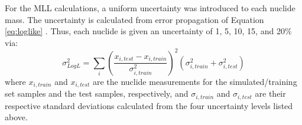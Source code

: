 For the \gls{MLL} calculations, a uniform uncertainty was introduced to each
nuclide mass.  The uncertainty is calculated from error propagation of Equation
\ref{eq:loglike} \cite{mll_method, mll_sensitivity}.  Thus, each nuclide is
given an uncertainty of 1, 5, 10, 15, and 20\% via:
\begin{equation}
  \sigma_{Log L}^2 = \sum_i \left( 
                            \frac{x_{i,test} - x_{i,train}}{\sigma_{i,train}^2}
                            \right)^2 
                            (\sigma_{i,train}^2 + \sigma_{i,test}^2)
  \label{eq:mllunc}
\end{equation}
where $x_{i,train}$ and $x_{i,test}$ are the nuclide measurements for the
simulated/training set samples and the test samples, respectively, and
$\sigma_{i,train}$ and $\sigma_{i,test}$ are their respective standard
deviations calculated from the four uncertainty levels listed above.  
